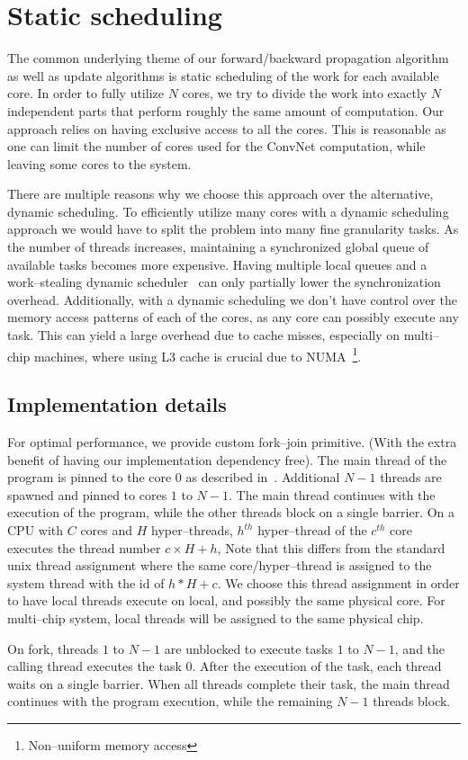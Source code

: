 \section{Static scheduling}

  The common underlying theme of our forward/backward propagation
  algorithm as well as update algorithms is static scheduling of the
  work for each available core.  In order to fully utilize $N$ cores,
  we try to divide the work into exactly $N$ independent parts that
  perform roughly the same amount of computation.  Our approach relies
  on having exclusive access to all the cores.  This is reasonable as
  one can limit the number of cores used for the ConvNet computation,
  while leaving some cores to the system.

  There are multiple reasons why we choose this approach over the
  alternative, dynamic scheduling.  To efficiently utilize many cores
  with a dynamic scheduling approach we would have to split the
  problem into many fine granularity tasks.  As the number of threads
  increases, maintaining a synchronized global queue of available
  tasks becomes more expensive.  Having multiple local queues and a
  work--stealing dynamic
  scheduler~\cite{reinders2007intel,willhalm2008putting} can only
  partially lower the synchronization overhead.  Additionally, with a
  dynamic scheduling we don't have control over the memory access
  patterns of each of the cores, as any core can possibly execute any
  task.  This can yield a large overhead due to cache misses,
  especially on multi--chip machines, where using L3 cache is crucial
  due to NUMA~\footnote{Non--uniform memory access}.

  \subsection{Implementation details}

  For optimal performance, we provide custom fork--join primitive.
  (With the extra benefit of having our implementation dependency
  free).  The main thread of the program is pinned to the core $0$ as
  described in~\cite{jeffers2015high}. Additional $N-1$ threads are
  spawned and pinned to cores $1$ to $N-1$.  The main thread continues
  with the execution of the program, while the other threads block on
  a single barrier.  On a CPU with $C$ cores and $H$ hyper--threads,
  $h^{th}$ hyper--thread of the $c^{th}$ core executes the thread
  number $c \times H + h$, Note that this differs from the standard
  unix thread assignment where the same core/hyper--thread is assigned
  to the system thread with the id of $h * H + c$.  We choose this
  thread assignment in order to have local threads execute on local,
  and possibly the same physical core.  For multi--chip system, local
  threads will be assigned to the same physical chip.

  On fork, threads $1$ to $N-1$ are unblocked to execute tasks $1$ to
  $N-1$, and the calling thread executes the task $0$.  After the
  execution of the task, each thread waits on a single barrier.  When
  all threads complete their task, the main thread continues with the
  program execution, while the remaining $N-1$ threads block.

